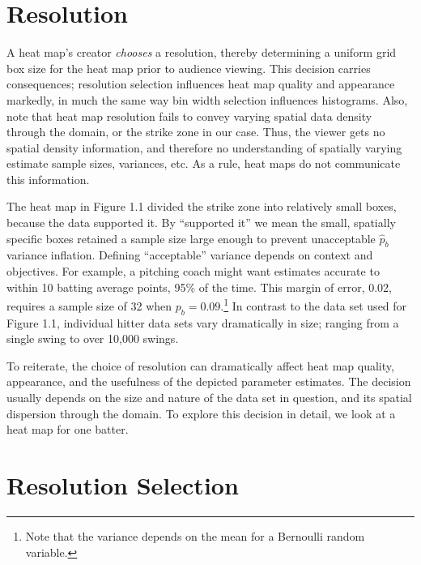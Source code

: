\section{Resolution} %

A heat map's creator {\it chooses} a resolution, thereby determining a uniform grid box size for the heat map prior to audience viewing. This decision carries consequences; resolution selection influences heat map quality and appearance markedly, in much the same way bin width selection influences histograms. Also, note that heat map resolution fails to convey varying spatial data density through the domain, or the strike zone in our case. Thus, the viewer gets no spatial density information, and therefore no understanding of spatially varying estimate sample sizes, variances, etc. As a rule, heat maps do not communicate this information.

The heat map in Figure 1.1 divided the strike zone into relatively small boxes, because the data supported it. By ``supported it'' we mean the small, spatially specific boxes retained a sample size large enough to prevent unacceptable $\hat{p}_{b}$ variance inflation. Defining ``acceptable'' variance depends on context and objectives. For example, a pitching coach might want estimates accurate to within 10 batting average points, 95\% of the time. This margin of error, 0.02, requires a sample size of 32 when $p_{b} = 0.09$.\footnote{Note that the variance depends on the mean for a Bernoulli random variable.} In contrast to the data set used for Figure 1.1, individual hitter data sets vary dramatically in size; ranging from a single swing to over 10,000 swings. 

To reiterate, the choice of resolution can dramatically affect heat map quality, appearance, and the usefulness of the depicted parameter estimates. The decision usually depends on the size and nature of the data set in question, and its spatial dispersion through the domain. To explore this decision in detail, we look at a heat map for one batter.

\section{Resolution Selection}

